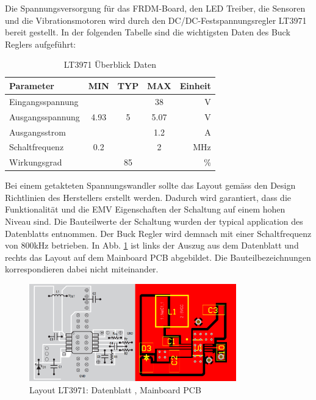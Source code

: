 Die Spannungsversorgung für das FRDM-Board, den LED Treiber, die Sensoren und die Vibrationsmotoren wird durch den DC/DC-Festspannungsregler LT3971 bereit gestellt. In der folgenden Tabelle sind die wichtigsten Daten des Buck Reglers aufgeführt:

\begin{table}[H]
	\small
	\centering
	\caption{LT3971 Überblick Daten \protect\cite{LT3971_Datasheet}}
	\begin{tabular}{|l|ccc|r|}
		\hline
		\textbf{Parameter} & \multicolumn{1}{l}{\textbf{MIN}} & \multicolumn{1}{l}{\textbf{TYP}} & \multicolumn{1}{l}{\textbf{MAX}} & \textbf{Einheit} \\
		\hline
		Eingangsspannung &       &       & 38    & V \\
		\hline
		Ausgangsspannung & 4.93  & 5     & 5.07  & V \\
		\hline
		Ausgangsstrom &       &       & 1.2   & A \\
		\hline
		Schaltfrequenz & 0.2   &       & 2     & MHz \\
		\hline
		Wirkungsgrad &       & 85    &       & \% \\
		\hline
	\end{tabular}%
	\label{tab:LT3971_Datasheet}%
\end{table}%

Bei einem getakteten Spannungswandler sollte das Layout gemäss den Design Richtlinien des Herstellers erstellt werden. Dadurch wird garantiert, dass die Funktionalität und die EMV Eigenschaften der Schaltung auf einem hohen Niveau sind. Die Bauteilwerte der Schaltung wurden der typical application des Datenblatts entnommen. Der Buck Regler wird demnach mit einer Schaltfrequenz von 800kHz betrieben. In Abb. \ref{fig:LT2971_Layout} ist links der Auszug aus dem Datenblatt und rechts das Layout auf dem Mainboard PCB abgebildet. Die Bauteilbezeichnungen korrespondieren dabei nicht miteinander.

\begin{figure}[H]
	\includegraphics[width=0.8\textwidth]{Illustrationen/6-Umsetzung/LT3971_Layout.png}
	\caption{Layout LT3971: Datenblatt \protect\cite{LT3971_Datasheet}, Mainboard PCB}
	\label{fig:LT2971_Layout}
\end{figure}

